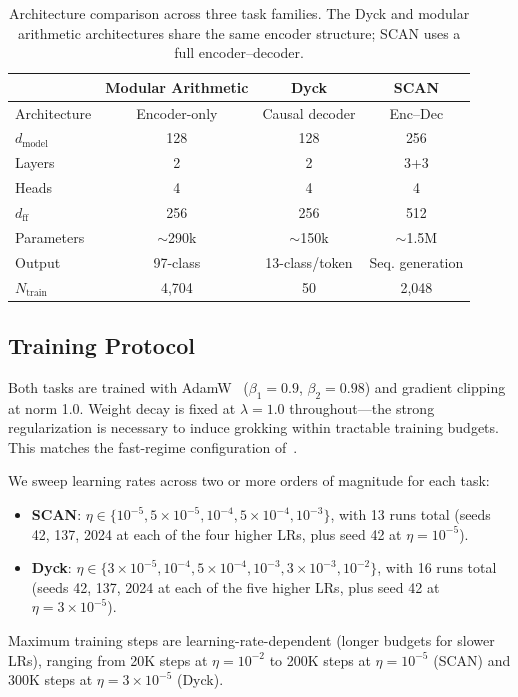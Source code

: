 \documentclass[11pt]{article}
\begin{document}
\begin{table}[t]
  \centering
  \caption{Architecture comparison across three task families. The Dyck and modular arithmetic architectures share the same encoder structure; SCAN uses a full encoder--decoder.}
  \label{tab:architecture_comparison}
  \small
  \begin{tabular}{@{}lccc@{}}
    \toprule
    & Modular Arithmetic & Dyck & SCAN \\
    \midrule
    Architecture & Encoder-only & Causal decoder & Enc--Dec \\
    $d_{\text{model}}$ & 128 & 128 & 256 \\
    Layers & 2 & 2 & 3+3 \\
    Heads & 4 & 4 & 4 \\
    $d_{\text{ff}}$ & 256 & 256 & 512 \\
    Parameters & $\sim$290k & $\sim$150k & $\sim$1.5M \\
    Output & 97-class & 13-class/token & Seq. generation \\
    $N_{\text{train}}$ & 4,704 & 50 & 2,048 \\
    \bottomrule
  \end{tabular}
\end{table}

\subsection{Training Protocol}

Both tasks are trained with AdamW~\citep{loshchilov2019decoupled} ($\beta_1 = 0.9$, $\beta_2 = 0.98$) and gradient clipping at norm 1.0. Weight decay is fixed at $\lambda = 1.0$ throughout---the strong regularization is necessary to induce grokking within tractable training budgets. This matches the fast-regime configuration of~\citet{xu2026integrability}.

We sweep learning rates across two or more orders of magnitude for each task:
\begin{itemize}
  \item \textbf{SCAN}: $\eta \in \{10^{-5}, 5{\times}10^{-5}, 10^{-4}, 5{\times}10^{-4}, 10^{-3}\}$, with 13 runs total (seeds 42, 137, 2024 at each of the four higher LRs, plus seed 42 at $\eta = 10^{-5}$).
  \item \textbf{Dyck}: $\eta \in \{3{\times}10^{-5}, 10^{-4}, 5{\times}10^{-4}, 10^{-3}, 3{\times}10^{-3}, 10^{-2}\}$, with 16 runs total (seeds 42, 137, 2024 at each of the five higher LRs, plus seed 42 at $\eta = 3{\times}10^{-5}$).
\end{itemize}
Maximum training steps are learning-rate-dependent (longer budgets for slower LRs), ranging from 20K steps at $\eta = 10^{-2}$ to 200K steps at $\eta = 10^{-5}$ (SCAN) and 300K steps at $\eta = 3 \times 10^{-5}$ (Dyck).
\end{document}
